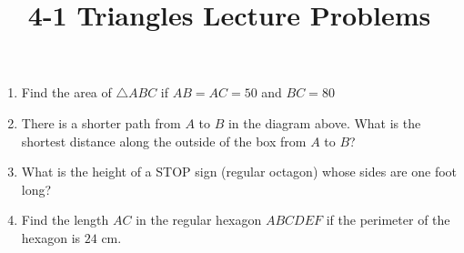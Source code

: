 \documentclass{article}
\title{4-1 Triangles Lecture Problems}
\date{}
\author{}
\begin{document}
\maketitle

\begin{enumerate}
    \item Find the area of $\triangle ABC$ if $AB = AC = 50$ and $BC = 80$
    \vspace{3cm}
    \item There is a shorter path from $A$ to $B$ in the diagram above.
    What is the shortest distance along the outside of the box from $A$ to $B$?
        \begin{center}
        \end{center}
        \vspace{3cm}
    \item What is the height of a STOP sign (regular octagon) whose sides are one foot long?
        \vspace{3cm}
    \item Find the length $AC$ in the regular hexagon $ABCDEF$ if the perimeter of the hexagon is $24$ cm.
        \vspace{3cm}
\end{enumerate}
\end{document}
